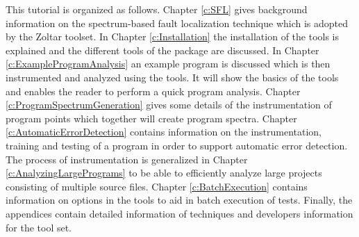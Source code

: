 This tutorial is organized as follows.
Chapter \ref{c:SFL} gives background information on the spectrum-based fault localization
technique which is adopted by the Zoltar toolset.
In Chapter \ref{c:Installation} the installation of the tools is explained
and the different tools of the package are discussed.
In Chapter \ref{c:ExampleProgramAnalysis} an example program is discussed
which is then instrumented and analyzed using the tools.
It will show the basics of the tools and enables the reader to perform
a quick program analysis.
Chapter \ref{c:ProgramSpectrumGeneration} gives some details of 
the instrumentation of program points which together will create program spectra.
Chapter \ref{c:AutomaticErrorDetection} contains information on 
the instrumentation, training and testing of a program in order to 
support automatic error detection.
The process of instrumentation is generalized in Chapter \ref{c:AnalyzingLargePrograms}
to be able to efficiently analyze large projects consisting of multiple source files.
Chapter \ref{c:BatchExecution} contains information on options in the tools to aid in
batch execution of tests.
Finally, the appendices contain detailed information of techniques and developers information
for the tool set.
